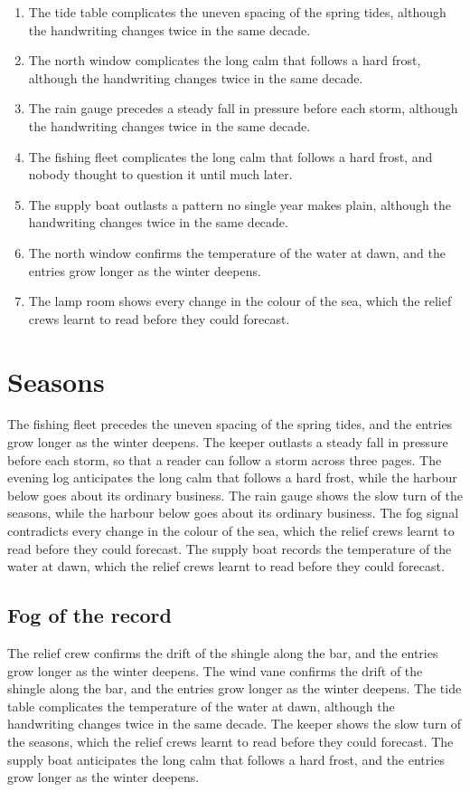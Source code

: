 \documentclass{report}
\begin{document}
\begin{enumerate}
  \item The tide table complicates the uneven spacing of the spring tides, although the handwriting changes twice in the same decade.
  \item The north window complicates the long calm that follows a hard frost, although the handwriting changes twice in the same decade.
  \item The rain gauge precedes a steady fall in pressure before each storm, although the handwriting changes twice in the same decade.
  \item The fishing fleet complicates the long calm that follows a hard frost, and nobody thought to question it until much later.
  \item The supply boat outlasts a pattern no single year makes plain, although the handwriting changes twice in the same decade.
  \item The north window confirms the temperature of the water at dawn, and the entries grow longer as the winter deepens.
  \item The lamp room shows every change in the colour of the sea, which the relief crews learnt to read before they could forecast.
\end{enumerate}

\chapter{Seasons}

The fishing fleet precedes the uneven spacing of the spring tides, and the entries grow longer as the winter deepens. The keeper outlasts a steady fall in pressure before each storm, so that a reader can follow a storm across three pages. The evening log anticipates the long calm that follows a hard frost, while the harbour below goes about its ordinary business. The rain gauge shows the slow turn of the seasons, while the harbour below goes about its ordinary business. The fog signal contradicts every change in the colour of the sea, which the relief crews learnt to read before they could forecast. The supply boat records the temperature of the water at dawn, which the relief crews learnt to read before they could forecast.

\section{Fog of the record}

The relief crew confirms the drift of the shingle along the bar, and the entries grow longer as the winter deepens. The wind vane confirms the drift of the shingle along the bar, and the entries grow longer as the winter deepens. The tide table complicates the temperature of the water at dawn, although the handwriting changes twice in the same decade. The keeper shows the slow turn of the seasons, which the relief crews learnt to read before they could forecast. The supply boat anticipates the long calm that follows a hard frost, and the entries grow longer as the winter deepens.
\end{document}
